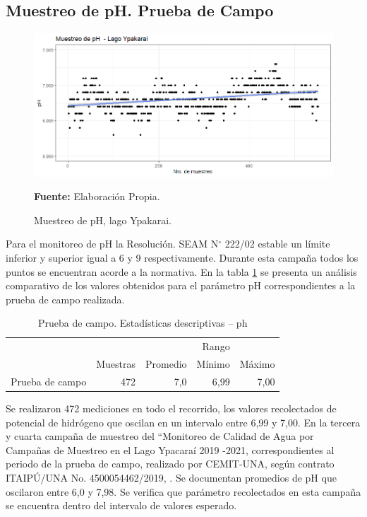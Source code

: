 \subsection{Muestreo de pH. Prueba de Campo}

\begin{figure}[H]
        \centering
        \includegraphics[width=0.75\linewidth]{Imagenes/cap4/pHLago.png}
        \caption {Muestreo de pH, lago Ypakarai. }{\textbf{Fuente:}
        Elaboraci\'on Propia. }
        \label{fig:Lago_ph}
\end{figure}

Para el monitoreo de pH la Resoluci\'on. SEAM N$ ^{\circ}$ 222/02 estable un l\'imite inferior y superior igual a 6 y 9 respectivamente. Durante esta campa\~na todos los puntos se encuentran acorde a la normativa.
En la tabla \ref{table:Lago_ph} se presenta un an\'alisis comparativo de los valores obtenidos para el par\'ametro pH correspondientes a la prueba de campo  realizada.

\begin{table}[H]
\centering
\caption{Prueba de campo. Estadísticas descriptivas – ph}
\label{table:Lago_ph}
\begin{tabular}{lrrrr}
\toprule & 
\multicolumn{3}{r}{Rango} \\ \cline{4-5} & 
Muestras & Promedio & Mínimo & Máximo \\
\midrule
Prueba de campo  &      472 &      7,0 &  6,99 &  7,00 \\
\bottomrule
\end{tabular}
\end{table}
Se realizaron 472 mediciones en todo el recorrido, los valores recolectados de potencial de hidr\'ogeno que oscilan en un intervalo entre 6,99 y 7,00.
En la tercera y cuarta campaña de muestreo del “Monitoreo de Calidad de Agua por Campañas de Muestreo en el Lago Ypacaraí 2019 -2021, correspondientes al periodo de la prueba de campo, realizado por CEMIT-UNA, seg\'un contrato ITAIPÚ/UNA No. 4500054462/2019, \cite{3er_Cemit}\cite{4to_Cemit}. Se documentan promedios de pH que oscilaron entre 6,0 y 7,98. 
Se verifica que par\'ametro recolectados en esta campa\~na se encuentra dentro del intervalo de valores esperado.


